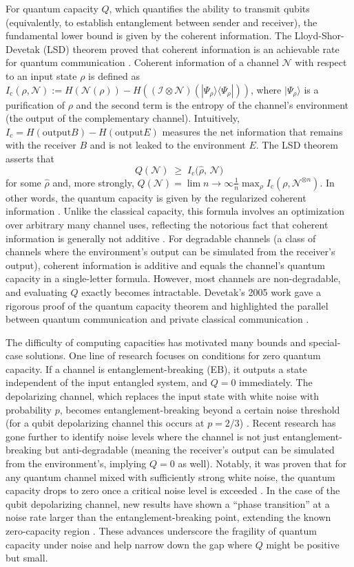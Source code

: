 \documentclass[11pt]{article}
\theoremstyle{plain}
\theoremstyle{definition}
\numberwithin{equation}{section}
\begin{document}
For quantum capacity $Q$, which quantifies the ability to transmit qubits (equivalently, to establish entanglement between sender and receiver), the fundamental lower bound is given by the coherent information. The Lloyd-Shor-Devetak (LSD) theorem proved that coherent information is an achievable rate for quantum communication \cite{44}. Coherent information of a channel $\mathcal{N}$ with respect to an input state $\rho$ is defined as $I_{\mathrm{c}}(\rho,\mathcal{N}) := H(\mathcal{N}(\rho)) - H((\mathcal{I}\otimes\mathcal{N})(|\Psi_\rho\rangle\langle\Psi_\rho|))$, where $|\Psi_\rho\rangle$ is a purification of $\rho$ and the second term is the entropy of the channel’s environment (the output of the complementary channel). Intuitively, $I_{\mathrm{c}} = H(\text{output}B) - H(\text{output}E)$ measures the net information that remains with the receiver $B$ and is not leaked to the environment $E$. The LSD theorem asserts that
\[
  Q(\mathcal{N}) \;\ge\; I_{\mathrm{c}}\bigl(\hat{\rho},\,\mathcal{N}\bigr)
\] for some  $\hat{\rho}$ and, more strongly, $Q(\mathcal{N}) = \lim{n\to\infty}\frac{1}{n}\max_{\rho}I_{\mathrm{c}}(\rho,\mathcal{N}^{\otimes n})$. In other words, the quantum capacity is given by the regularized coherent information \cite{11}. Unlike the classical capacity, this formula involves an optimization over arbitrary many channel uses, reflecting the notorious fact that coherent information is generally not additive \cite{11}. For degradable channels (a class of channels where the environment’s output can be simulated from the receiver’s output), coherent information is additive and equals the channel’s quantum capacity in a single-letter formula. However, most channels are non-degradable, and evaluating $Q$ exactly becomes intractable. Devetak’s 2005 work gave a rigorous proof of the quantum capacity theorem and highlighted the parallel between quantum communication and private classical communication \cite{55}.


The difficulty of computing capacities has motivated many bounds and special-case solutions. One line of research focuses on conditions for zero quantum capacity. If a channel is entanglement-breaking (EB), it outputs a state independent of the input entangled system, and $Q=0$ immediately. The depolarizing channel, which replaces the input state with white noise with probability $p$, becomes entanglement-breaking beyond a certain noise threshold (for a qubit depolarizing channel this occurs at $p=2/3$) \cite{66}. Recent research has gone further to identify noise levels where the channel is not just entanglement-breaking but anti-degradable (meaning the receiver’s output can be simulated from the environment’s, implying $Q=0$ as well). Notably, it was proven that for any quantum channel mixed with sufficiently strong white noise, the quantum capacity drops to zero once a critical noise level is exceeded \cite{11}. In the case of the qubit depolarizing channel, new results have shown a “phase transition” at a noise rate larger than the entanglement-breaking point, extending the known zero-capacity region \cite{11}. These advances underscore the fragility of quantum capacity under noise \cite{11} and help narrow down the gap where $Q$ might be positive but small.
\end{document}
